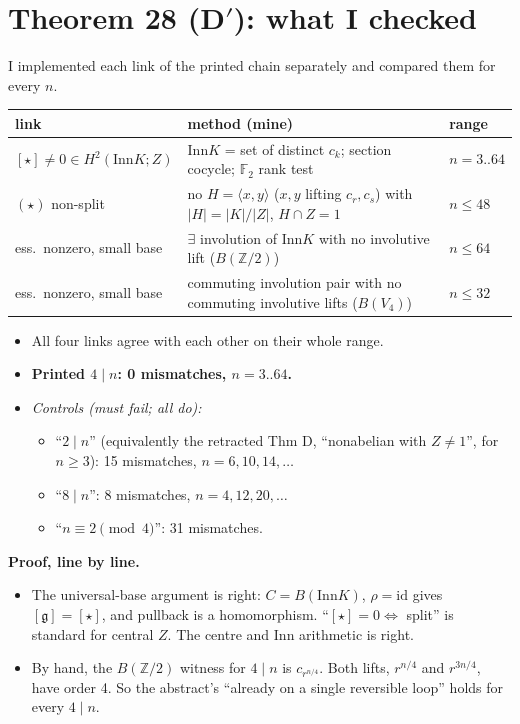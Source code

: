 \documentclass[10pt]{article}
\newcommand{\Z}{\mathbb{Z}}
\newcommand{\Inn}{\mathrm{Inn}}\newcommand{\Out}{\mathrm{Out}}\newcommand{\Aut}{\mathrm{Aut}}
\begin{document}
\section{Theorem 28 (D$'$): what I checked}
I implemented each link of the printed chain separately and compared them for every $n$.
\begin{center}\small
\begin{tabular}{lll}
\toprule
link & method (mine) & range\\\midrule
$[\star]\neq0\in H^2(\Inn K;Z)$ & $\Inn K$ = set of distinct $c_k$; section cocycle; $\mathbb F_2$ rank test & $n=3..64$\\
$(\star)$ non-split & no $H=\langle x,y\rangle$ ($x,y$ lifting $c_r,c_s$) with $|H|=|K|/|Z|$, $H\cap Z=1$ & $n\le48$\\
ess.\ nonzero, small base & $\exists$ involution of $\Inn K$ with no involutive lift ($B(\Z/2)$) & $n\le64$\\
ess.\ nonzero, small base & commuting involution pair with no commuting involutive lifts ($B(V_4)$) & $n\le32$\\
\bottomrule
\end{tabular}
\end{center}
\begin{itemize}
\item All four links agree with each other on their whole range.
\item \textbf{Printed $4\mid n$: 0 mismatches, $n=3..64$.}
\item \emph{Controls (must fail; all do):}
  \begin{itemize}
  \item ``$2\mid n$'' (equivalently the retracted Thm D, ``nonabelian with $Z\neq1$'', for $n\ge3$): 15 mismatches, $n=6,10,14,\dots$
  \item ``$8\mid n$'': 8 mismatches, $n=4,12,20,\dots$
  \item ``$n\equiv2\pmod4$'': 31 mismatches.
  \end{itemize}
\end{itemize}
\textbf{Proof, line by line.}
\begin{itemize}
\item The universal-base argument is right: $C=B(\Inn K)$, $\rho=\mathrm{id}$ gives $[\mathfrak g]=[\star]$, and pullback is a homomorphism. ``$[\star]=0\iff$ split'' is standard for central $Z$. The centre and $\Inn$ arithmetic is right.
\item By hand, the $B(\Z/2)$ witness for $4\mid n$ is $c_{r^{n/4}}$. Both lifts, $r^{n/4}$ and $r^{3n/4}$, have order 4. So the abstract's ``already on a single reversible loop'' holds for every $4\mid n$.
\end{itemize}
\end{document}
